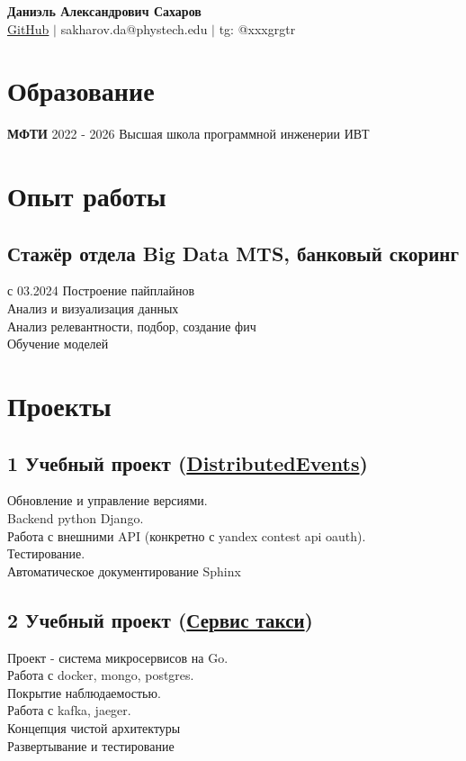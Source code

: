 \documentclass[a4paper,10pt]{article}
\begin{document}
\begin{center}
    \textbf{\LARGE Даниэль Александрович Сахаров} \\
    \vspace{5pt}
    \href{https://github.com/grgtr}{GitHub} $\vert$
    sakharov.da@phystech.edu $\vert$ 
    tg: @xxxgrgtr
\end{center}

\section*{Образование}
\noindent
\textbf{МФТИ} \hfill 2022 - 2026
Высшая школа программной инженерии ИВТ

\section*{Опыт работы}
\noindent
\subsection*{Стажёр отдела Big Data MTS, банковый скоринг}
с 03.2024
Построение пайплайнов \\
Анализ и визуализация данных \\
Анализ релевантности, подбор, создание фич \\
Обучение моделей

\section*{Проекты}
\noindent
\subsection*{1 Учебный проект (\href{https://github.com/hsse-distributed-events-team/devents-second-semester}{DistributedEvents})}
Обновление и управление версиями. \\
Backend python Django. \\
Работа с внешними API (конкретно с yandex contest api oauth). \\
Тестирование. \\
Автоматическое документирование Sphinx

\subsection*{2 Учебный проект (\href{https://github.com/VS-CDR/final-project_hsse}{Сервис такси})}
Проект - система микросервисов на Go. \\
Работа с docker, mongo, postgres. \\
Покрытие наблюдаемостью. \\
Работа с kafka, jaeger. \\
Концепция чистой архитектуры \\
Развертывание и тестирование
\end{document}
